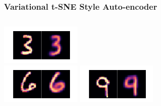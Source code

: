 \documentclass[10pt, usenames, dvipsnames, table]{beamer}
\begin{document}
\begin{frame}
  \frametitle{Variational t-SNE Style Auto-encoder}
  \begin{columns}
    \includegraphics[width=\linewidth]
    {models/mnist_vaestudent_e300_L2_b64/reconstruction_0} \\
    \vspace{2em}
    \includegraphics[width=\linewidth]
    {models/mnist_vaestudent_e300_L2_b64/reconstruction_2}
    \includegraphics[width=\linewidth]
    {models/mnist_vaestudent_e300_L2_b64/reconstruction_3} \\

\end{columns}
\end{frame}
\end{document}
